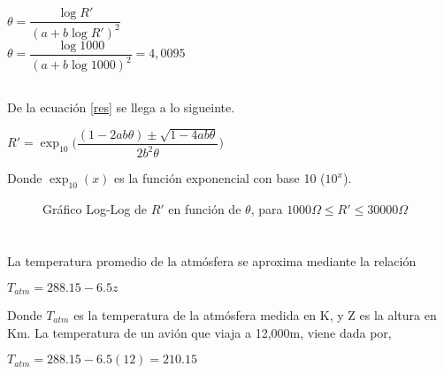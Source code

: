 \documentclass[12pt]{article}
\begin{document}
\subsection{}
\begin{center}
  $\theta =\dfrac {\log{R'}}{{(a+b \log{R'})}^2}$\\
  $\theta =\dfrac {\log{1000}}{{(a+b\log{1000})}^2}=4,0095$
\end{center}

\subsection{}
De la ecuación \eqref{res} se llega a lo sigueinte.\\
\begin{center}
  $R'=\exp_{10}{\Big(\dfrac{(1-2ab\theta)\pm \sqrt{1-4ab\theta}}{2b^2\theta}\Big)}$
\end{center}
Donde $\exp_{10}(x)$ es la función exponencial con base 10 ($10^x$).
\begin{figure}[H]
  \centering
  \scalebox{.9}{}
  \caption{Gráfico Log-Log de $R'$ en función de $\theta$, para $1000 \Omega \leq R' \leq 30000 \Omega$}
\end{figure}
\section{}
La temperatura promedio de la atmósfera se aproxima mediante la relación\\
\begin{center}
  $T_{atm}=288.15-6.5z$
\end{center}
Donde $T_{atm}$ es la temperatura de la atmósfera medida en K, y Z es la altura en Km.
La temperatura de un avión que viaja a 12,000m, viene dada por,
\begin{center}
  $T_{atm}=288.15-6.5(12)=210.15$
\end{center}
\end{document}
